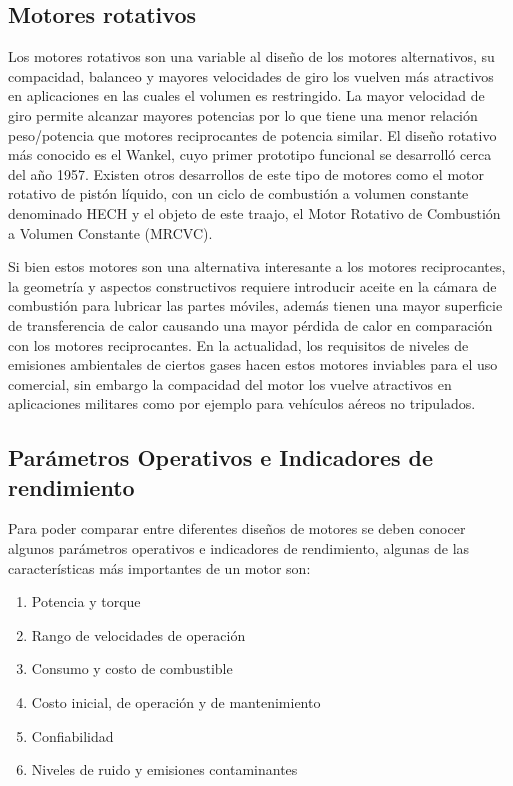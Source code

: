 
\subsection{Motores rotativos}
%
Los motores rotativos son una variable al diseño de los motores alternativos, su
compacidad, balanceo y mayores velocidades de giro los vuelven más atractivos en
aplicaciones en las cuales el volumen es restringido.
%
La mayor velocidad de giro permite alcanzar mayores potencias por lo que tiene
una menor relación peso/potencia que motores reciprocantes de potencia similar.
%
El diseño rotativo más conocido es el Wankel, cuyo primer prototipo funcional se
desarrolló cerca del año 1957.
%
Existen otros desarrollos de este tipo de motores como el motor
rotativo de pistón líquido, con un ciclo de combustión a volumen constante
denominado HECH\parencite{hehc_05} y el objeto de este traajo, el Motor Rotativo
de Combustión a Volumen Constante (MRCVC).

Si bien estos motores son una alternativa interesante a los motores
reciprocantes, la geometría y aspectos constructivos requiere introducir aceite
en la cámara de combustión para lubricar las partes móviles, además tienen una
mayor superficie de transferencia de calor causando una mayor pérdida de calor
en comparación con los motores reciprocantes.
%
En la actualidad, los requisitos de niveles de emisiones ambientales de ciertos
gases hacen estos motores inviables para el uso comercial, sin embargo la
compacidad del motor los vuelve atractivos en aplicaciones militares como por
ejemplo para vehículos aéreos no tripulados.



\subsection{Parámetros Operativos e Indicadores de rendimiento}
%
Para poder comparar entre diferentes diseños de motores se deben conocer algunos
parámetros operativos e indicadores de rendimiento, algunas de las
características más importantes de un motor son:
%
\begin{enumerate}
    \item Potencia y torque
    \item Rango de velocidades de operación
    \item Consumo y costo de combustible
    \item Costo inicial, de operación y de mantenimiento
    \item Confiabilidad
    \item Niveles de ruido y emisiones contaminantes
\end{enumerate}

